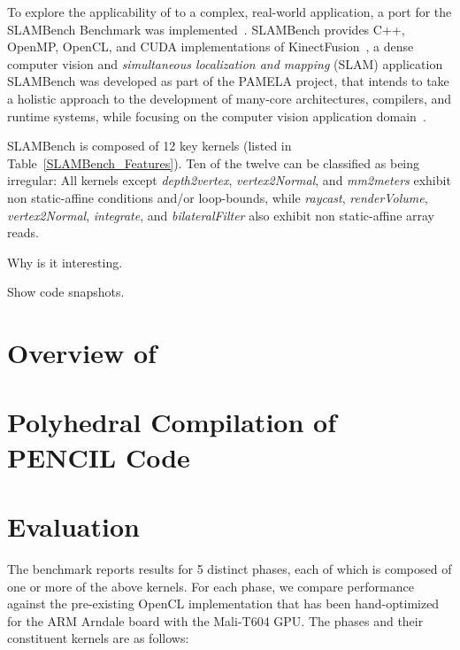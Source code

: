 \documentclass{llncs}
\begin{document}
To explore the applicability of \pencil to a complex,
real-world application, a \pencil port for the SLAMBench
Benchmark was implemented~\cite{SLAMBench2015}.
SLAMBench provides C++, OpenMP, OpenCL, and CUDA implementations
of KinectFusion~\cite{KinectFusion2011}, a dense computer vision
and \textit{simultaneous localization and mapping} (SLAM)
application
SLAMBench was developed as part of the PAMELA project, that
intends to take a holistic approach to the development
of many-core architectures, compilers, and runtime systems,
while focusing on the computer vision application
domain~\cite{PAMELAWeb2012}.

SLAMBench is composed of 12 key kernels (listed in
Table~\ref{SLAMBench_Features}). 
Ten of the twelve can be classified as being irregular:
All kernels except \textit{depth2vertex}, \textit{vertex2Normal},
and \textit{mm2meters} exhibit non static-affine conditions and/or
loop-bounds, while \textit{raycast}, \textit{renderVolume},
\textit{vertex2Normal}, \textit{integrate}, and
\textit{bilateralFilter} also exhibit non static-affine array reads.


Why is it interesting.


Show code snapshots.


\section{Overview of \pencil{}}



\section{Polyhedral Compilation of PENCIL Code}



\section{Evaluation}
\label{slambench}

The benchmark reports results for 5 distinct phases, each of which
is composed of one or more of the above kernels.
For each phase, we compare performance against the pre-existing OpenCL
implementation that has been hand-optimized for the ARM Arndale board
with the Mali-T604 GPU. The phases and their constituent kernels are
as follows:
\end{document}
